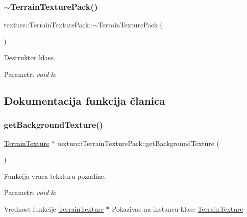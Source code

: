 \subsubsection{\texorpdfstring{$\sim$\+Terrain\+Texture\+Pack()}{~TerrainTexturePack()}}
{\footnotesize\ttfamily texture\+::\+Terrain\+Texture\+Pack\+::$\sim$\+Terrain\+Texture\+Pack (\begin{DoxyParamCaption}{ }\end{DoxyParamCaption})}



Destruktor klase. 


\begin{DoxyParams}{Parametri}
{\em void} & \\
\hline
\end{DoxyParams}


\subsection{Dokumentacija funkcija članica}
\mbox{\label{classtexture_1_1TerrainTexturePack_afcc4cf5d8e58eb3668cb0bb0e92ac6d9}} 
\subsubsection{\texorpdfstring{get\+Background\+Texture()}{getBackgroundTexture()}}
{\footnotesize\ttfamily \hyperlink{classtexture_1_1TerrainTexture}{Terrain\+Texture} $\ast$ texture\+::\+Terrain\+Texture\+Pack\+::get\+Background\+Texture (\begin{DoxyParamCaption}{ }\end{DoxyParamCaption})}



Funkcija vraca teksturu pozadine. 


\begin{DoxyParams}{Parametri}
{\em void} & \\
\hline
\end{DoxyParams}
\begin{DoxyReturn}{Vrednost funkcije}
\hyperlink{classtexture_1_1TerrainTexture}{Terrain\+Texture} $\ast$ Pokazivac na instancu klase \hyperlink{classtexture_1_1TerrainTexture}{Terrain\+Texture} 
\end{DoxyReturn}
\mbox{\label{classtexture_1_1TerrainTexturePack_a458ca66ed71f945af5e3878de073bb33}} 
